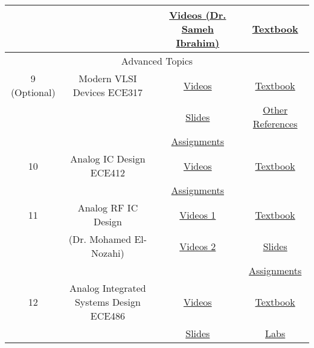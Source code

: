 \documentclass{article}
\begin{document}
\begin{table}[H]
{\begin{tabular}{|c|c|c|c|}
            & & \href{https://youtube.com/playlist?list=PLiPOIc07mr4yzlzBnjsFfmar6aLDCjFxf}{Videos (Dr. Sameh Ibrahim)}& \href{http://www.iqytechnicalcollege.com/BAE\%20665-Fabrication\%20Engineering\%20at\%20the\%20Micro\%20and\%20Nanoscale.pdf}{Textbook}\\\hline
            \multicolumn{4}{|c|}{Advanced Topics}\\ \hline
            9 (Optional)& Modern VLSI Devices ECE317& \href{https://youtube.com/playlist?list=PLDifeaWAlc2i_tSYNxYS0EebTxB_DRkze}{Videos}& \href{https://drive.google.com/file/d/1iohr9EQ8qikB7vHep3AdtENCkofKVXMb/view?usp=share_link}{Textbook}\\ 
            & & \href{https://drive.google.com/drive/folders/1jO6g5Xyzy01T0tYh9YmxKfsWu469HKEz}{Slides}& \href{https://drive.google.com/drive/folders/19w8PZIsnvOFmTJD12s_gzMHg0pPdioc0}{Other References}\\
            & & \href{https://drive.google.com/drive/folders/1OjNouQ5AG_85e_rhGR2T9132h76MdE1j}{Assignments}& \\ \hline
            10& Analog IC Design ECE412& \href{https://youtube.com/playlist?list=PLM1qWL0qm6Kj_SiFuB3pLSbE2G8Q7rna_}{Videos}& \href{https://drive.google.com/file/d/10jptwIjZyKZucCfCkCYNZDeIluk5ocQV/view}{Textbook}\\ 
            & & \href{https://drive.google.com/drive/folders/1dzoqpRZuC4HecpirSiTjN538SSDdOwRa}{Assignments}& \\\hline
            11& Analog RF IC Design& \href{https://youtube.com/playlist?list=PLrwcpgRKGrGfq3Mzbdkbza3dPBB30a67o}{Videos 1}& \href{https://drive.google.com/file/d/1zguUyrjY7MBE0t0HYZgf9VSAm8uMJN7o/view?usp=share_link}{Textbook}\\ 
            & (Dr. Mohamed El-Nozahi)& \href{https://youtube.com/playlist?list=PLWS6ZGNcgIS3D_dh19qa-9UW98BLijnc9}{Videos 2}& \href{https://drive.google.com/drive/folders/1DuT27jDbddwKh8m_E3qbohwGW35PYW28}{Slides}\\ 
            & & & \href{https://drive.google.com/drive/folders/1M_RwTUrpAP5W3yRWPZGOeQ72jcS4d3nR}{Assignments}\\\hline
            12& Analog Integrated Systems Design ECE486& \href{https://youtube.com/playlist?list=PLMSBalys69yxMAla5am1cJ-__GGkMyuFi}{Videos}& \href{https://link.springer.com/book/10.1007/978-3-030-90808-9}{Textbook}\\ 
            & & \href{https://drive.google.com/drive/folders/1P1eR9ih6PlXjk31y1_eucaYytVVz-5DM}{Slides}& \href{https://drive.google.com/drive/folders/1Q7ZbEdv-5skkqEj5j8ooOujP1t5eUBgP}{Labs}\\ \hline

\end{tabular}}
\end{table}
\end{document}
